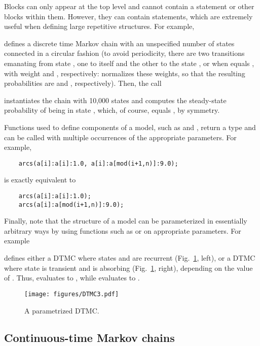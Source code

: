 Blocks can only appear at the top level and cannot contain a
 statement or other blocks within them.
However, they can contain  statements, which are
extremely useful when defining large repetitive structures.
For example,
%

%
defines a discrete time Markov chain with an unspecified number
 of states connected in a circular fashion
(to avoid periodicity, there are two transitions emanating from state
, one to itself and the other to the state ,
or  when  equals , with weight
 and , respectively:
{\smart} normalizes these weights, so that the resulting probabilities are
 and , respectively).
Then, the call
%

%
instantiates the chain  with 10,000 states and computes the
steady-state probability of being in state , which, of course,
equals , by symmetry.

Functions used to define components of a model, such as  and
, return a type  and can be called with multiple
occurrences of the appropriate parameters.
For example,
\begin{lstlisting}
    arcs(a[i]:a[i]:1.0, a[i]:a[mod(i+1,n)]:9.0);
\end{lstlisting}
is exactly equivalent to
\begin{lstlisting}
    arcs(a[i]:a[i]:1.0);
    arcs(a[i]:a[mod(i+1,n)]:9.0);
\end{lstlisting}


Finally, note that the structure of a model can be parameterized in essentially
arbitrary ways by using functions such as  or  on
appropriate parameters.
For example
%

%
defines either a DTMC where states  and  are recurrent
(Fig.~\ref{FIG:DTMC3}, left),
or a DTMC where state  is transient and  is absorbing
(Fig.~\ref{FIG:DTMC3}, right), depending on the value of .
Thus,  evaluates to , while 
evaluates to .

\begin{figure}
  \centering
  \texttt{[image: figures/DTMC3.pdf]}
  \caption{A parametrized DTMC.}
  \label{FIG:DTMC3}
\end{figure}


\subsection{Continuous-time Markov chains} \label{SEC:CTMC}

